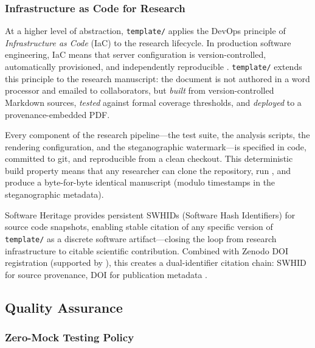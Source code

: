\documentclass[
  english,
]{article}
\begin{document}
\subsubsection{Infrastructure as Code for
Research}\label{infrastructure-as-code-for-research}

At a higher level of abstraction, \texttt{template/} applies the DevOps
principle of \emph{Infrastructure as Code} (IaC) to the research
lifecycle. In production software engineering, IaC means that server
configuration is version-controlled, automatically provisioned, and
independently reproducible \citep{wilson2017good}. \texttt{template/}
extends this principle to the research manuscript: the document is not
authored in a word processor and emailed to collaborators, but
\emph{built} from version-controlled Markdown sources, \emph{tested}
against formal coverage thresholds, and \emph{deployed} to a
provenance-embedded PDF.

Every component of the research pipeline---the test suite, the analysis
scripts, the rendering configuration, and the steganographic
watermark---is specified in code, committed to git, and reproducible
from a clean checkout. This deterministic build property means that any
researcher can clone the repository, run
, and produce a byte-for-byte identical
manuscript (modulo timestamps in the steganographic metadata).

Software Heritage \citep{cosmo2020softwareheritage} provides persistent
SWHIDs (Software Hash Identifiers) for source code snapshots, enabling
stable citation of any specific version of \texttt{template/} as a
discrete software artifact---closing the loop from research
infrastructure to citable scientific contribution. Combined with Zenodo
DOI registration (supported by ), this
creates a dual-identifier citation chain: SWHID for source provenance,
DOI for publication metadata \citep{katz2021software}.

\newpage

\subsection{Quality Assurance}\label{quality-assurance}

\subsubsection{Zero-Mock Testing Policy}\label{zero-mock-testing-policy}
\end{document}
